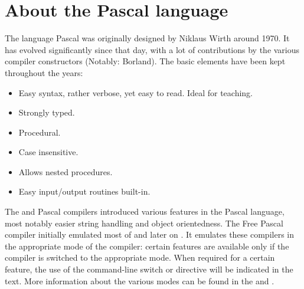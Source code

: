 \section*{About the Pascal language}
The language Pascal was originally designed by Niklaus Wirth around 1970.
It has evolved significantly since that day, with a lot of contributions
by the various compiler constructors (Notably: Borland). The basic elements
have been kept throughout the years:
\begin{itemize}
\item Easy syntax, rather verbose, yet easy to read. Ideal for teaching.
\item Strongly typed.
\item Procedural.
\item Case insensitive.
\item Allows nested procedures.
\item Easy input/output routines built-in.
\end{itemize}

The \tp and \delphi Pascal compilers introduced various features in the
Pascal language, most notably easier string handling and object orientedness.
The Free Pascal compiler initially emulated most of \tp and later on
\delphi. It emulates these compilers in the appropriate mode of the compiler:
certain features are available only if the compiler is switched to the appropriate
mode. When required for a certain feature, the use of the  command-line
switch or  directive will be indicated in the text. More information
about the various modes can be found in the \userref and \progref.


